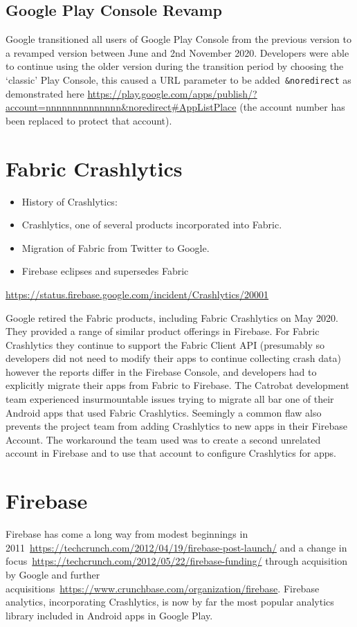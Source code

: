 \subsection{Google Play Console Revamp}
Google transitioned all users of Google Play Console from the previous version to a revamped version between June and 2nd November 2020. Developers were able to continue using the older version during the transition period by choosing the `classic' Play Console, this caused a URL parameter to be added~\texttt{\&noredirect} as demonstrated here
\url{https://play.google.com/apps/publish/?account=nnnnnnnnnnnnnn\&noredirect#AppListPlace} (the account number has been replaced to protect that account).

\section{Fabric Crashlytics}

\begin{itemize}
    \item History of Crashlytics:
    \item Crashlytics, one of several products incorporated into Fabric.
    \item Migration of Fabric from Twitter to Google.
    \item Firebase eclipses and supersedes Fabric
\end{itemize}

\url{https://status.firebase.google.com/incident/Crashlytics/20001}

Google retired the Fabric products, including Fabric Crashlytics on  May 2020. They provided a range of similar product offerings in Firebase. For Fabric Crashlytics they continue to support the Fabric Client API (presumably so developers did not need to modify their apps to continue collecting crash data) however the reports differ in the Firebase Console, and developers had to explicitly migrate their apps from Fabric to Firebase. The Catrobat development team experienced insurmountable issues trying to migrate all bar one of their Android apps that used Fabric Crashlytics. Seemingly a common flaw also prevents the project team from adding Crashlytics to new apps in their Firebase Account. The workaround the team used was to create a second unrelated account in Firebase and to use that account to configure Crashlytics for apps. %

\section{Firebase}
Firebase has come a long way from modest beginnings in 2011~\url{https://techcrunch.com/2012/04/19/firebase-post-launch/} and a change in focus~\url{https://techcrunch.com/2012/05/22/firebase-funding/} through acquisition by Google and further acquisitions~\url{https://www.crunchbase.com/organization/firebase}. Firebase analytics, incorporating Crashlytics, is now by far the most popular analytics library included in Android apps in Google Play. 

